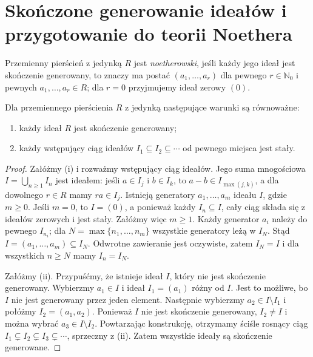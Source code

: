 \section{Skończone generowanie ideałów i przygotowanie do teorii Noethera}
\begin{definicja}
\label{aa:def:noetherian-ring-intro}
Przemienny pierścień z jedynką $R$ jest
\emph{noetherowski}, jeśli każdy jego ideał jest
skończenie generowany, to znaczy ma postać
$(a_1,\ldots,a_r)$ dla pewnego $r\in\mathbb N_0$
i pewnych $a_1,\ldots,a_r\in R$; dla $r=0$
przyjmujemy ideał zerowy $(0)$.
\end{definicja}

\begin{twierdzenie}
\label{aa:tw:noetherian-acc}
Dla przemiennego pierścienia $R$ z jedynką
następujące warunki są równoważne:
\begin{enumerate}[label=\textup{(\roman*)}]
\item każdy ideał $R$ jest skończenie generowany;
\item każdy wstępujący ciąg ideałów
$I_1\subseteq I_2\subseteq\cdots$ od pewnego miejsca jest stały.
\end{enumerate}
\end{twierdzenie}
\begin{proof}
Załóżmy (i) i rozważmy wstępujący ciąg ideałów.
Jego suma mnogościowa $I=\bigcup_{n\ge1}I_n$ jest
ideałem: jeśli $a\in I_j$ i $b\in I_k$, to
$a-b\in I_{\max(j,k)}$, a dla dowolnego $r\in R$
mamy $ra\in I_j$. Istnieją generatory
$a_1,\ldots,a_m$ ideału $I$, gdzie $m\ge0$.
Jeśli $m=0$, to $I=(0)$, a ponieważ każdy
$I_n\subseteq I$, cały ciąg składa się z ideałów
zerowych i jest stały. Załóżmy więc $m\ge1$.
Każdy generator $a_i$ należy do pewnego $I_{n_i}$;
dla $N=\max\{n_1,\ldots,n_m\}$ wszystkie generatory
leżą w $I_N$. Stąd $I=(a_1,\ldots,a_m)\subseteq I_N$.
Odwrotne zawieranie jest oczywiste, zatem $I_N=I$
i dla wszystkich $n\ge N$ mamy $I_n=I_N$.

Załóżmy (ii). Przypuśćmy, że istnieje ideał $I$,
który nie jest skończenie generowany. Wybierzmy
$a_1\in I$ i ideał $I_1=(a_1)$ różny od $I$.
Jest to możliwe, bo $I$ nie jest generowany przez
jeden element. Następnie wybierzmy
$a_2\in I\setminus I_1$ i połóżmy
$I_2=(a_1,a_2)$. Ponieważ $I$ nie jest skończenie
generowany, $I_2\ne I$ i można wybrać
$a_3\in I\setminus I_2$. Powtarzając konstrukcję,
otrzymamy ściśle rosnący ciąg
$I_1\subsetneq I_2\subsetneq I_3\subsetneq\cdots$,
sprzeczny z (ii). Zatem wszystkie ideały są
skończenie generowane.
\end{proof}

